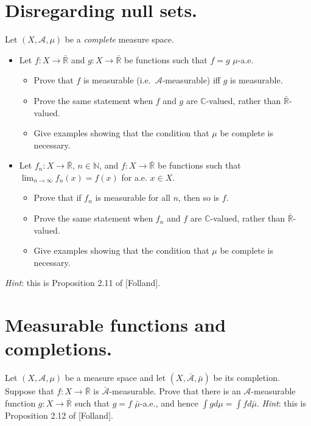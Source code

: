 \documentclass{qlnotes-export}
\begin{document}
\section{Disregarding null sets.}

Let \((X,\mathcal{A},\mu)\) be a \emph{complete} measure space.

\begin{itemize}
\item
  Let \(f:X\rightarrow\bar{\mathbb{R}}\) and \(g:X\rightarrow\bar{\mathbb{R}}\) be functions such that \(f = g\) \(\mu\)-a.e.

  \begin{itemize}
  \item
    Prove that \(f\) is measurable (i.e.~\(\mathcal{A}\)-measurable) iff \(g\) is measurable.
  \item
    Prove the same statement when \(f\) and \(g\) are \(\mathbb{C}\)-valued, rather than \(\bar{\mathbb{R}}\)-valued.
  \item
    Give examples showing that the condition that \(\mu\) be complete is necessary.
  \end{itemize}
\item
  Let \(f_{n}:X\rightarrow\bar{\mathbb{R}}\), \(n \in {\mathbb{N}}\), and \(f:X\rightarrow\bar{\mathbb{R}}\) be functions such that \(\lim_{n\rightarrow\infty}f_{n}(x) = f(x)\) for a.e. \(x \in X\).

  \begin{itemize}
  \item
    Prove that if \(f_{n}\) is measurable for all \(n\), then so is \(f\).
  \item
    Prove the same statement when \(f_{n}\) and \(f\) are \(\mathbb{C}\)-valued, rather than \(\bar{\mathbb{R}}\)-valued.
  \item
    Give examples showing that the condition that \(\mu\) be complete is necessary.
  \end{itemize}
\end{itemize}

\emph{Hint}: this is Proposition 2.11 of {[}Folland{]}.

\section{Measurable functions and completions.}

Let \((X,\mathcal{A},\mu)\) be a measure space and let \((X,\bar{\mathcal{A}},\bar{\mu})\) be its completion. Suppose that \(f:X\rightarrow\bar{\mathbb{R}}\) is \(\bar{\mathcal{A}}\)-measurable. Prove that there is an \(\mathcal{A}\)-measurable function \(g:X\rightarrow\bar{\mathbb{R}}\) such that \(g = f\) \(\bar{\mu}\)-a.e., and hence \(\int g d\mu = \int f d\bar{\mu}\). \emph{Hint}: this is Proposition 2.12 of {[}Folland{]}.
\end{document}
